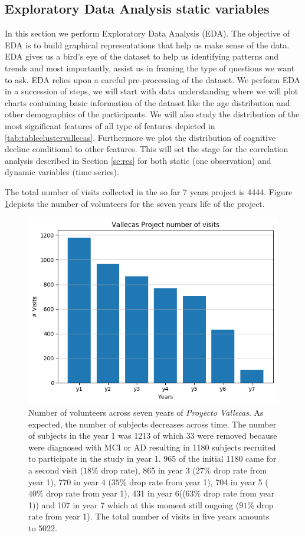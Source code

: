 \documentclass[11pt]{article}
\theoremstyle{definition}
\theoremstyle{remark}
\begin{document}
\subsection{Exploratory Data Analysis static variables}
In this section we perform Exploratory Data Analysis (EDA). The objective of EDA is to build graphical representations that help us make sense of the data. EDA gives us a bird's eye of the dataset to help us identifying patterns and trends and most importantly, assist us in framing the type of questions we want to ask.
EDA relies upon a careful pre-processing of the dataset. We perform EDA in a succession of steps, we will start with data understanding where we will plot charts containing basic information of the dataset like the age distribution and other demographics of the participants. 
We will also study the distribution of the most significant features of all type of features depicted in \ref{tab:tableclustervallecas}. Furthermore we plot the distribution of cognitive decline conditional to other features. This will set the stage for the correlation analysis described in Section \ref{se:res} for both static (one observation) and dynamic variables (time series). 

The total number of visits collected in the so far 7 years project is 4444. Figure \ref{fig:pv5years}depicts the number of volunteers for the seven years life of the project.

\begin{figure}[H]
        \centering
        \includegraphics[keepaspectratio, width=0.5\linewidth]{figures/Fig_visits}
        \caption{Number of volunteers across seven years of \emph{Proyecto Vallecas}. As expected, the number of subjects decreases across time. The number of subjects in the year 1 was 1213 of which 33 were removed because were diagnosed with MCI or AD resulting in 1180 subjects recruited to participate in the study in year 1. 965 of the initial 1180 came for a second visit ($18\%$ drop rate), 865 in year 3 ($27\%$ drop rate from year 1), 770 in year 4 ($35\%$ drop rate from year 1), 704 in year 5 ($40\%$ drop rate from year 1), 431 in year 6(($63\%$ drop rate from year 1)) and 107 in year 7 which at this moment still ongoing ($91\%$ drop rate from year 1). The total number of visits in five years amounts to 5022.} \label{fig:pv5years}
\end{figure}
\end{document}
